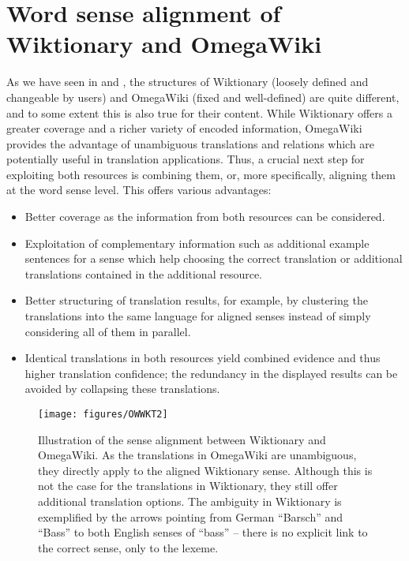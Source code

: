 \documentclass[output=paper]{LSP/langsci}
\begin{document}
\section{Word sense alignment of Wiktionary and OmegaWiki}
\label{sec:matuschek:alignment}
As we have seen in  and , the structures of Wiktionary (loosely defined and changeable by users) and OmegaWiki (fixed and well-defined) are quite different, and to some extent this is also true for their content. While Wiktionary offers a greater coverage and a richer variety of encoded information, OmegaWiki provides the advantage of unambiguous translations and relations which are potentially useful in translation applications. Thus, a crucial  next step for exploiting both resources is combining them, or, more specifically, aligning them at the word sense level. This offers various advantages:
\begin{itemize}
\item Better coverage as the information from both resources can be considered.
\item Exploitation of complementary information such as additional example sentences for a sense which help choosing the correct translation or additional translations contained in the additional resource.
\item Better structuring of translation results, for example, by clustering the translations into the same language for aligned senses instead of simply considering all of them in parallel.
\item Identical translations  in both resources yield combined evidence and thus higher translation confidence; the redundancy in the displayed results can be avoided by collapsing these translations.
\end{itemize}

\begin{figure*} [!ht]
 \begin{center}
 \texttt{[image: figures/OWWKT2]}
 \caption{\label{alignment}Illustration of the sense alignment between Wiktionary and OmegaWiki. As the translations in OmegaWiki are unambiguous, they directly apply to the aligned Wiktionary sense. Although this is not the case for the translations in Wiktionary, they still offer additional translation options. The ambiguity in Wiktionary is exemplified by the arrows pointing from German ``Barsch'' and ``Bass'' to both English senses of ``bass'' -- there is no explicit link to the correct sense, only to the lexeme.}
 \end{center}
\end{figure*}
 
\end{document}
